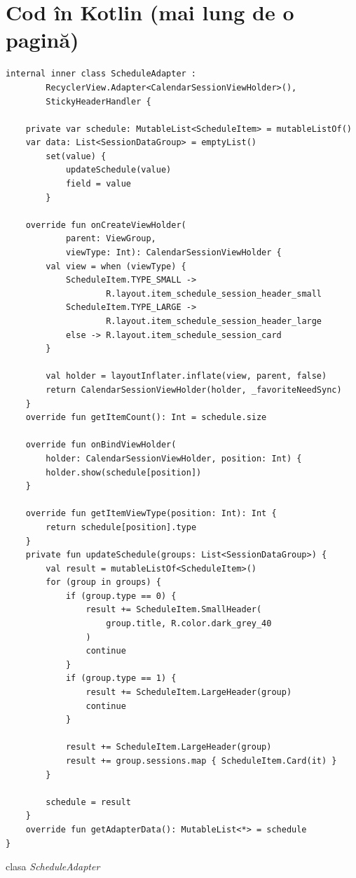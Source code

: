 \newpage
\section{Cod în Kotlin (mai lung de o pagină)}
\label{anexa7:listing_kotlin}

\begin{code}
    \begin{verbatim}
internal inner class ScheduleAdapter : 
        RecyclerView.Adapter<CalendarSessionViewHolder>(),
        StickyHeaderHandler {
        
    private var schedule: MutableList<ScheduleItem> = mutableListOf()
    var data: List<SessionDataGroup> = emptyList()
        set(value) {
            updateSchedule(value)
            field = value
        }

    override fun onCreateViewHolder(
            parent: ViewGroup, 
            viewType: Int): CalendarSessionViewHolder {
        val view = when (viewType) {
            ScheduleItem.TYPE_SMALL ->
                    R.layout.item_schedule_session_header_small
            ScheduleItem.TYPE_LARGE -> 
                    R.layout.item_schedule_session_header_large
            else -> R.layout.item_schedule_session_card
        }

        val holder = layoutInflater.inflate(view, parent, false)
        return CalendarSessionViewHolder(holder, _favoriteNeedSync)
    }
    override fun getItemCount(): Int = schedule.size

    override fun onBindViewHolder(
        holder: CalendarSessionViewHolder, position: Int) {
        holder.show(schedule[position])
    }

    override fun getItemViewType(position: Int): Int {
        return schedule[position].type
    }
    private fun updateSchedule(groups: List<SessionDataGroup>) {
        val result = mutableListOf<ScheduleItem>()
        for (group in groups) {
            if (group.type == 0) {
                result += ScheduleItem.SmallHeader(
                    group.title, R.color.dark_grey_40
                )
                continue
            }
            if (group.type == 1) {
                result += ScheduleItem.LargeHeader(group)
                continue
            }

            result += ScheduleItem.LargeHeader(group)
            result += group.sessions.map { ScheduleItem.Card(it) }
        }

        schedule = result
    }
    override fun getAdapterData(): MutableList<*> = schedule
}
    \end{verbatim}
    \caption{clasa \textit{ScheduleAdapter}} 
    \label{code:kotlin_scheduleAdapter}
\end{code}

